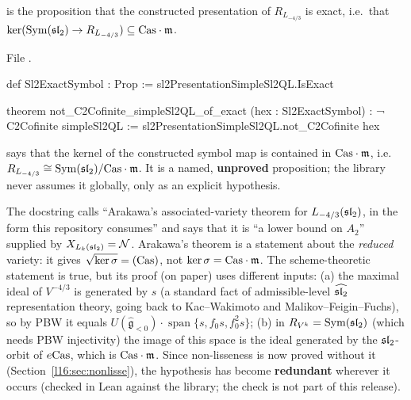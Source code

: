 \begin{definition}\label{l16:def:exact}
 is the proposition that the constructed presentation of $R_{L_{-4/3}}$ is exact, i.e.\ that
$\ker(\operatorname{Sym}(\mathfrak{sl}_2)\to R_{L_{-4/3}})\subseteq\mathrm{Cas}\cdot\mathfrak m$.
\end{definition}
\noindent File .
\begin{leancode}
def Sl2ExactSymbol : Prop := sl2PresentationSimpleSl2QL.IsExact

theorem not_C2Cofinite_simpleSl2QL_of_exact (hex : Sl2ExactSymbol) : ¬ C2Cofinite simpleSl2QL :=
  sl2PresentationSimpleSl2QL.not_C2Cofinite hex
\end{leancode}

\begin{dictionary}
 says that the kernel of the constructed symbol map is contained in $\mathrm{Cas}\cdot\mathfrak m$, i.e.\
$R_{L_{-4/3}}\cong\operatorname{Sym}(\mathfrak{sl}_2)/\mathrm{Cas}\cdot\mathfrak m$. It is a named, \textbf{unproved}
proposition; the library never assumes it globally, only as an explicit hypothesis.
\end{dictionary}

\begin{warning}[title={The citation attached to \texttt{Sl2ExactSymbol} names a weaker theorem (documentation only)}]
The docstring calls \lean{Sl2ExactSymbol} ``Arakawa's associated-variety theorem for $L_{-4/3}(\mathfrak{sl}_2)$, in the form this
repository consumes'' and says that it is ``a lower bound on $A_2$'' supplied by $X_{L_k(\mathfrak{sl}_2)} = \mathcal{N}$. Arakawa's
theorem is a statement about the \emph{reduced} variety: it gives $\sqrt{\ker\sigma} = (\mathrm{Cas})$, not
$\ker\sigma = \mathrm{Cas}\cdot\mathfrak m$. The scheme-theoretic statement \lean{Sl2ExactSymbol} is true, but its proof
(on paper) uses different inputs: (a) the maximal ideal of $V^{-4/3}$ is generated by $s$ (a standard fact of admissible-level
$\widehat{\mathfrak{sl}_2}$ representation theory, going back to Kac--Wakimoto and Malikov--Feigin--Fuchs), so by PBW it equals $U(\hat{\mathfrak g}_{<0})\cdot\operatorname{span}\{s,f_0s,f_0^2s\}$; (b) in
$R_{V^k} = \operatorname{Sym}(\mathfrak{sl}_2)$ (which needs PBW injectivity) the image of this space is the ideal generated by the
$\mathfrak{sl}_2$-orbit of $e\mathrm{Cas}$, which is $\mathrm{Cas}\cdot\mathfrak m$. Since non-lisseness is now proved without it
(Section~\ref{l16:sec:nonlisse}), the hypothesis has become \textbf{redundant} wherever it occurs (checked in Lean against the
library; the check is not part of this release).
\end{warning}

